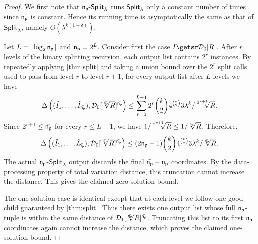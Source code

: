 \begin{proof}
We first note that $\mathsf{n_p}\text{-}{\mathsf{Split}}_\lambda$ runs ${\mathsf{Split}}_\lambda$ only a constant number of times since $\mathsf{n_p}$ is constant. Hence its running time is asymptotically the same as that of ${\mathsf{Split}}_\lambda$, namely $O(\lambda^{k(1-\delta)})$.

Let $L=\lceil\log_2\mathsf{n_p}\rceil$ and $\bar{\mathsf{n_p}}=2^L$. Consider first the case $\instance\getsr\zkcdistzero{R}$. After $r$ levels of the binary splitting recursion, each output list contains $2^r$ instances. By repeatedly applying \cref{thm:split} and taking a union bound over the $2^r$ split calls used to pass from level $r$ to level $r+1$, for every output list after $L$ levels we have
\[
\Delta\left(
(\hat{I}_1,\ldots,\hat{I}_{\bar{\mathsf{n_p}}}),
\mathcal{D}_0[\sqrt[\bar{\mathsf{n_p}}]{R}]^{\bar{\mathsf{n_p}}}
\right)
\leq
\sum_{r=0}^{L-1}
2^r\binom{k}{2}4^{\binom{k}{2}}3\lambda^k/\sqrt[2^{r+1}]{R}.
\]
Since $2^{r+1}\leq \bar{\mathsf{n_p}}$ for every $r\leq L-1$, we have
$1/\sqrt[2^{r+1}]{R}\leq 1/\sqrt[\bar{\mathsf{n_p}}]{R}$. Therefore,
\[
\Delta\left(
(\hat{I}_1,\ldots,\hat{I}_{\bar{\mathsf{n_p}}}),
\mathcal{D}_0[\sqrt[\bar{\mathsf{n_p}}]{R}]^{\bar{\mathsf{n_p}}}
\right)
\leq
(2\bar{\mathsf{n_p}}-1)\binom{k}{2}4^{\binom{k}{2}}3\lambda^k/\sqrt[\bar{\mathsf{n_p}}]{R}.
\]
The actual $\mathsf{n_p}$-${\mathsf{Split}}_\lambda$ output discards the final $\bar{\mathsf{n_p}}-\mathsf{n_p}$ coordinates. By the data-processing property of total variation distance, this truncation cannot increase the distance. This gives the claimed zero-solution bound.

The one-solution case is identical except that at each level we follow one good child guaranteed by \cref{thm:split}. Thus there exists one output list whose full $\bar{\mathsf{n_p}}$-tuple is within the same distance of
$\mathcal{D}_1[\sqrt[\bar{\mathsf{n_p}}]{R}]^{\bar{\mathsf{n_p}}}$. Truncating this list to its first $\mathsf{n_p}$ coordinates again cannot increase the distance, which proves the claimed one-solution bound.
\end{proof}
